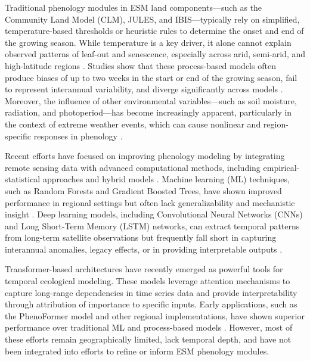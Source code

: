 \documentclass[pdflatex,sn-mathphys-num]{sn-jnl}%
\theoremstyle{thmstyleone}%
\theoremstyle{thmstyletwo}%
\theoremstyle{thmstylethree}%
\begin{document}
Traditional phenology modules in ESM land components—such as the Community Land Model (CLM), JULES, and IBIS—typically rely on simplified, temperature-based thresholds or heuristic rules to determine the onset and end of the growing season. While temperature is a key driver, it alone cannot explain observed patterns of leaf-out and senescence, especially across arid, semi-arid, and high-latitude regions \citep{zhao_plant_2013, wadgymar_phenological_2018}. Studies show that these process-based models often produce biases of up to two weeks in the start or end of the growing season, fail to represent interannual variability, and diverge significantly across models \citep{peano_plant_2021, richardson_terrestrial_2012}. Moreover, the influence of other environmental variables—such as soil moisture, radiation, and photoperiod—has become increasingly apparent, particularly in the context of extreme weather events, which can cause nonlinear and region-specific responses in phenology \citep{qiu_understanding_2020, wang_comparison_2022}.

Recent efforts have focused on improving phenology modeling by integrating remote sensing data with advanced computational methods, including empirical-statistical approaches and hybrid models \citep{satake_forecasting_2013, guan_study_2023}. Machine learning (ML) techniques, such as Random Forests and Gradient Boosted Trees, have shown improved performance in regional settings but often lack generalizability and mechanistic insight \citep{seyednasrollah_tracking_2019, jeong_random_2016}. Deep learning models, including Convolutional Neural Networks (CNNs) and Long Short-Term Memory (LSTM) networks, can extract temporal patterns from long-term satellite observations but frequently fall short in capturing interannual anomalies, legacy effects, or in providing interpretable outputs \citep{liu_modeling_2020, guan_study_2023}.

Transformer-based architectures have recently emerged as powerful tools for temporal ecological modeling. These models leverage attention mechanisms to capture long-range dependencies in time series data and provide interpretability through attribution of importance to specific inputs. Early applications, such as the PhenoFormer model and other regional implementations, have shown superior performance over traditional ML and process-based models \citep{wang_comparison_2022}. However, most of these efforts remain geographically limited, lack temporal depth, and have not been integrated into efforts to refine or inform ESM phenology modules.
\end{document}
